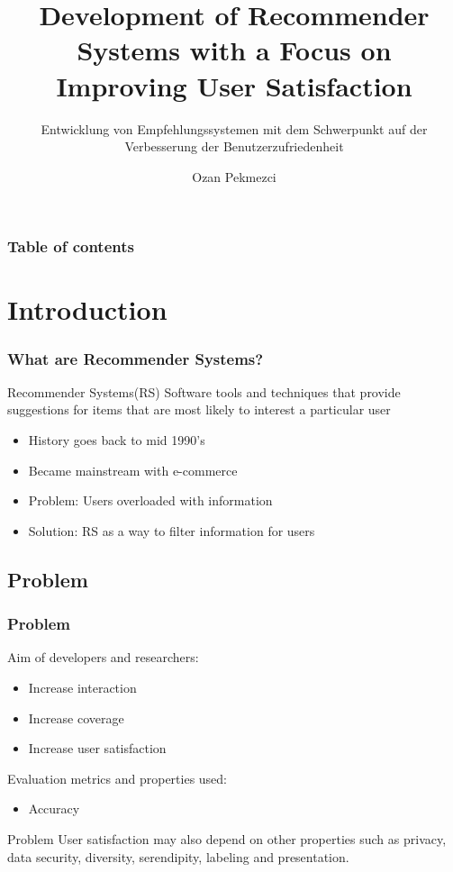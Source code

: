 \documentclass{beamer}
\title{Development of Recommender Systems with a Focus on Improving User Satisfaction
}
\author{Ozan Pekmezci}
\institute
{
  Lehrstuhl für Datenverarbeitung\\
}
\subtitle{Entwicklung von Empfehlungssystemen mit dem Schwerpunkt auf der Verbesserung der Benutzerzufriedenheit}
\begin{document}
\begin{frame}
	\titlepage
\end{frame}

\begin{frame}
   \frametitle{Table of contents}
   \tableofcontents[subsectionstyle=hide]
\end{frame} 

\section{Introduction} 
\begin{frame}
   \frametitle{What are Recommender Systems?} 
    \begin{block}{Recommender Systems(RS)}
   	Software tools and techniques that provide suggestions for items that are most likely to interest a particular user
   \end{block}
   \begin{itemize}
	\item History goes back to mid 1990's
	\item Became mainstream with e-commerce
	\item Problem: Users overloaded with information
	\item Solution: RS as a way to filter information for users
\end{itemize} 

\end{frame}



\subsection{Problem}
\begin{frame} 
\frametitle{Problem} 
	Aim of developers and researchers:
   \begin{itemize}
   	\item Increase interaction
   	\item Increase coverage
   	\item Increase user satisfaction
   \end{itemize} 
	Evaluation metrics and properties used:
\begin{itemize}
	\item Accuracy
\end{itemize} 
   \begin{alertblock}{Problem}
	User satisfaction may also depend on other properties such as privacy, data security, diversity, serendipity, labeling and presentation.
\end{alertblock}
\end{frame}
\end{document}
